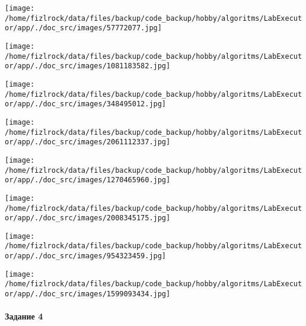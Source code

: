 \documentclass[a4paper, 12pt]{article}
\begin{document}
\texttt{[image: /home/fizlrock/data/files/backup/code\_backup/hobby/algoritms/LabExecutor/app/./doc\_src/images/57772077.jpg]}

\texttt{[image: /home/fizlrock/data/files/backup/code\_backup/hobby/algoritms/LabExecutor/app/./doc\_src/images/1081183582.jpg]}

\texttt{[image: /home/fizlrock/data/files/backup/code\_backup/hobby/algoritms/LabExecutor/app/./doc\_src/images/348495012.jpg]}

\texttt{[image: /home/fizlrock/data/files/backup/code\_backup/hobby/algoritms/LabExecutor/app/./doc\_src/images/2061112337.jpg]}

\texttt{[image: /home/fizlrock/data/files/backup/code\_backup/hobby/algoritms/LabExecutor/app/./doc\_src/images/1270465960.jpg]}

\texttt{[image: /home/fizlrock/data/files/backup/code\_backup/hobby/algoritms/LabExecutor/app/./doc\_src/images/2008345175.jpg]}

\texttt{[image: /home/fizlrock/data/files/backup/code\_backup/hobby/algoritms/LabExecutor/app/./doc\_src/images/954323459.jpg]}

\texttt{[image: /home/fizlrock/data/files/backup/code\_backup/hobby/algoritms/LabExecutor/app/./doc\_src/images/1599093434.jpg]}
\pagebreak
\paragraph{Задание 4}
\end{document}
